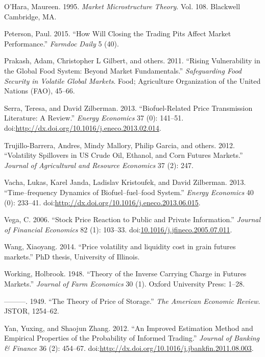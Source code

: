 \documentclass[]{elsarticle} %
\begin{document}
O'Hara, Maureen. 1995. \emph{Market Microstructure Theory}. Vol. 108.
Blackwell Cambridge, MA.

Peterson, Paul. 2015. ``How Will Closing the Trading Pits Affect Market
Performance.'' \emph{Farmdoc Daily} 5 (40).

Prakash, Adam, Christopher L Gilbert, and others. 2011. ``Rising
Vulnerability in the Global Food System: Beyond Market Fundamentals.''
\emph{Safeguarding Food Security in Volatile Global Markets}. Food;
Agriculture Organization of the United Nations (FAO), 45--66.

Serra, Teresa, and David Zilberman. 2013. ``Biofuel-Related Price
Transmission Literature: A Review.'' \emph{Energy Economics} 37 (0):
141--51.
doi:\href{http://dx.doi.org/http://dx.doi.org/10.1016/j.eneco.2013.02.014}{http://dx.doi.org/10.1016/j.eneco.2013.02.014}.

Trujillo-Barrera, Andres, Mindy Mallory, Philip Garcia, and others.
2012. ``Volatility Spillovers in US Crude Oil, Ethanol, and Corn Futures
Markets.'' \emph{Journal of Agricultural and Resource Economics} 37 (2):
247.

Vacha, Lukas, Karel Janda, Ladislav Kristoufek, and David Zilberman.
2013. ``Time--frequency Dynamics of Biofuel--fuel--food System.''
\emph{Energy Economics} 40 (0): 233--41.
doi:\href{http://dx.doi.org/http://dx.doi.org/10.1016/j.eneco.2013.06.015}{http://dx.doi.org/10.1016/j.eneco.2013.06.015}.

Vega, C. 2006. ``Stock Price Reaction to Public and Private
Information.'' \emph{Journal of Financial Economics} 82 (1): 103--33.
doi:\href{http://dx.doi.org/10.1016/j.jfineco.2005.07.011}{10.1016/j.jfineco.2005.07.011}.

Wang, Xiaoyang. 2014. ``Price volatility and liquidity cost in grain
futures markets.'' PhD thesis, University of Illinois.

Working, Holbrook. 1948. ``Theory of the Inverse Carrying Charge in
Futures Markets.'' \emph{Journal of Farm Economics} 30 (1). Oxford
University Press: 1--28.

---------. 1949. ``The Theory of Price of Storage.'' \emph{The American
Economic Review}. JSTOR, 1254--62.

Yan, Yuxing, and Shaojun Zhang. 2012. ``An Improved Estimation Method
and Empirical Properties of the Probability of Informed Trading.''
\emph{Journal of Banking \& Finance} 36 (2): 454--67.
doi:\href{http://dx.doi.org/http://dx.doi.org/10.1016/j.jbankfin.2011.08.003}{http://dx.doi.org/10.1016/j.jbankfin.2011.08.003}.
\end{document}
